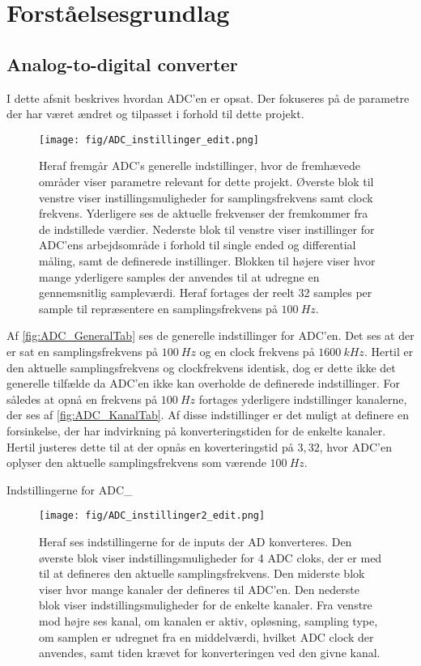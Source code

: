 \chapter{Forståelsesgrundlag}
\section{Analog-to-digital converter}
I dette afsnit beskrives hvordan ADC'en er opsat. Der fokuseres på de parametre der har været ændret og tilpasset i forhold til dette projekt.

\begin{figure}[H]
	\centering
	\texttt{[image: fig/ADC\_instillinger\_edit.png]}
	\caption{Heraf fremgår ADC's generelle indstillinger, hvor de fremhævede områder viser parametre relevant for dette projekt. Øverste blok til venstre viser instillingsmuligheder for samplingsfrekvens samt clock frekvens. Yderligere ses de aktuelle frekvenser der fremkommer fra de indstillede værdier. Nederste blok til venstre viser instillinger for ADC'ens arbejdsområde i forhold til single ended og differential måling, samt de definerede instillinger. Blokken til højere viser hvor mange yderligere samples der anvendes til at udregne en gennemsnitlig sampleværdi. Heraf fortages der reelt 32 samples per sample til repræsentere en samplingsfrekvens på $100~Hz$.}
	\label{fig:ADC_GeneralTab}
\end{figure}

Af \autoref{fig:ADC_GeneralTab} ses de generelle indstillinger for ADC'en. Det ses at der er sat en samplingsfrekvens på $100~Hz$ og en clock frekvens på $1600~kHz$. Hertil er den aktuelle samplingsfrekvens og clockfrekvens identisk, dog er dette ikke det generelle tilfælde da ADC'en ikke kan overholde de definerede indstillinger. For således at opnå en frekvens på $100~Hz$ fortages yderligere indstillinger kanalerne, der ses af \autoref{fig:ADC_KanalTab}. Af disse indstillinger er det muligt at definere en forsinkelse, der har indvirkning på konverteringstiden for de enkelte kanaler. Hertil justeres dette til at der opnås en koverteringstid på $3,32$, hvor ADC'en oplyser den aktuelle samplingsfrekvens som værende $100~Hz$. 

Indstillingerne for ADC_


\begin{figure}[H]
	\centering 
	\texttt{[image: fig/ADC\_instillinger2\_edit.png]}
	\caption{Heraf ses indstillingerne for de inputs der AD konverteres. Den øverste blok viser indstillingsmuligheder for 4 ADC cloks, der er med til at defineres den aktuelle samplingsfrekvens. Den miderste blok viser hvor mange kanaler der defineres til ADC'en. Den nederste blok viser indstillingsmuligheder for de enkelte kanaler. Fra venstre mod højre ses kanal, om kanalen er aktiv, opløsning, sampling type, om samplen er udregnet fra en middelværdi, hvilket ADC clock der anvendes, samt tiden krævet for konverteringen ved den givne kanal.}
	\label{fig:ADC_KanalTab}
\end{figure}


